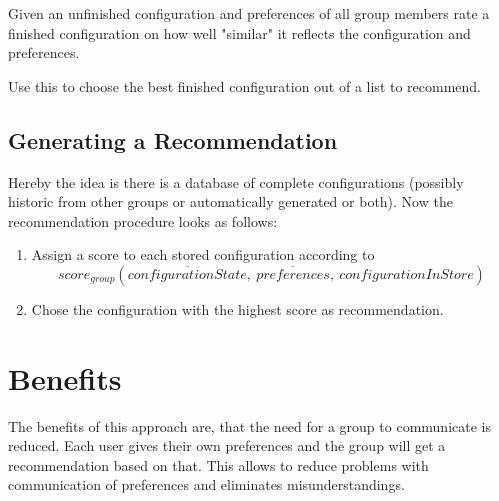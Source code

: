 Given an unfinished configuration and preferences of all group members rate a finished configuration on how well "similar" it reflects the configuration and preferences.

Use this to choose the best finished configuration out of a list to recommend.

\subsection{Generating a Recommendation}
\label{sec:Concept:GeneratingRecommendation}

Hereby the idea is there is a database of complete configurations (possibly historic from other groups or automatically generated or both).
Now the recommendation procedure looks as follows:

\begin{enumerate}
    \item Assign a score to each stored configuration according to $$score_{group}(\overline{configurationState},\ \overline{preferences}, \ configurationInStore)$$
    \item Chose the configuration with the highest score as recommendation.
\end{enumerate}



\section{Benefits}
\label{sec:Concept:Benefits}

The benefits of this approach are, that the need for a group to communicate is reduced. Each user gives their own preferences and the group will get a recommendation based on that. This allows to reduce problems with communication of preferences and eliminates misunderstandings.
    
